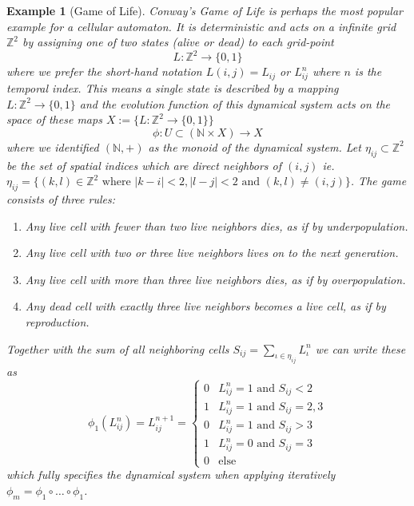 \documentclass{article}
\newtheorem{example}[definition]{Example}
\begin{document}
\begin{example}[Game of Life]
    \label{example:game-of-life}
    Conway's Game of Life is perhaps the most popular example for a cellular automaton.
    It is deterministic and acts on a infinite grid $\mathbb{Z}^2$ by assigning one of two states
    (alive or dead) to each grid-point
    \begin{equation}
        L:\mathbb{Z}^2\rightarrow\{0,1\}
    \end{equation}
    where we prefer the short-hand notation $L(i,j)=L_{ij}$ or $L^n_{ij}$ where $n$ is the temporal
    index.
    This means a single state is described by a mapping $L:\mathbb{Z}^2\rightarrow\{0,1\}$ and the
    evolution function of this dynamical system acts on the space of these maps
    $X:=\{L:\mathbb{Z}^2\rightarrow\{0,1\}\}$
    \begin{equation}
        \phi:U\subset(\mathbb{N}\times X) \rightarrow X
    \end{equation}
    where we identified $(\mathbb{N},+)$ as the monoid of the dynamical system.
    Let $\eta_{ij}\subset\mathbb{Z}^2$ be the set of spatial indices which are direct neighbors of
    $(i,j)$ ie. $\eta_{ij}=\{(k,l)\in\mathbb{Z}^2 \text{ where } |k-i|<2, |l-j|<2 \text{ and }
    (k,l)\neq(i,j)\}$.
    The game consists of three rules:
    \begin{enumerate}
        \item Any live cell with fewer than two live neighbors dies, as if by underpopulation.
        \item Any live cell with two or three live neighbors lives on to the next generation.
        \item Any live cell with more than three live neighbors dies, as if by overpopulation.
        \item Any dead cell with exactly three live neighbors becomes a live cell, as if by
            reproduction.
    \end{enumerate}
    Together with the sum of all neighboring cells $S_{ij}=\sum\limits_{\iota\in\eta_{ij}}L^n_\iota$
    we can write these as
    \begin{equation}
        \phi_1(L_{ij}^n) = L_{ij}^{n+1} =
        \begin{cases}
            0 &L^n_{ij}=1 \text{ and } S_{ij}<2\\
            1 &L^n_{ij}=1 \text{ and } S_{ij}=2,3\\
            0 &L^n_{ij}=1 \text{ and } S_{ij}>3\\
            1 &L^n_{ij}=0 \text{ and } S_{ij}=3\\
            0 &\text{else}
        \end{cases}
    \end{equation}
    which fully specifies the dynamical system when applying iteratively
    $\phi_m=\phi_1\circ\dots\circ\phi_1$.
\end{example}
\end{document}
